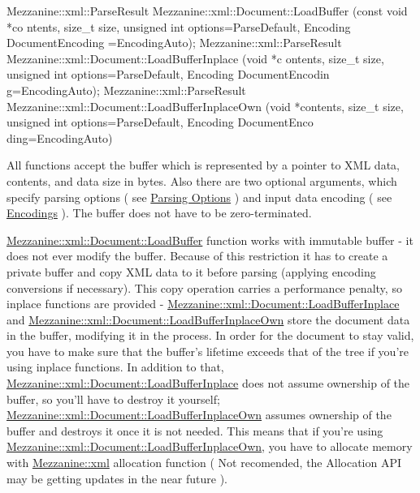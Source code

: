 \begin{DoxyCode}
 Mezzanine::xml::ParseResult Mezzanine::xml::Document::LoadBuffer (const void *co
      ntents, size_t size, unsigned int options=ParseDefault, Encoding DocumentEncoding
      =EncodingAuto);
 Mezzanine::xml::ParseResult Mezzanine::xml::Document::LoadBufferInplace (void *c
      ontents, size_t size, unsigned int options=ParseDefault, Encoding DocumentEncodin
      g=EncodingAuto);
 Mezzanine::xml::ParseResult Mezzanine::xml::Document::LoadBufferInplaceOwn (void
       *contents, size_t size, unsigned int options=ParseDefault, Encoding DocumentEnco
      ding=EncodingAuto)
\end{DoxyCode}
 All functions accept the buffer which is represented by a pointer to XML data, contents, and data size in bytes. Also there are two optional arguments, which specify parsing options ( see \hyperlink{XMLManual_XMLLoadingParsingOptions}{Parsing Options} ) and input data encoding ( see \hyperlink{XMLManual_XMLLoadingEncodings}{Encodings} ). The buffer does not have to be zero-\/terminated. \par
 \par
 \hyperlink{classMezzanine_1_1xml_1_1Document_a37117f3f1e6f5a834c638421a3d4b7ec}{Mezzanine::xml::Document::LoadBuffer} function works with immutable buffer -\/ it does not ever modify the buffer. Because of this restriction it has to create a private buffer and copy XML data to it before parsing (applying encoding conversions if necessary). This copy operation carries a performance penalty, so inplace functions are provided -\/ \hyperlink{classMezzanine_1_1xml_1_1Document_af53e73f421e6a4ad8655262c377ceb8a}{Mezzanine::xml::Document::LoadBufferInplace} and \hyperlink{classMezzanine_1_1xml_1_1Document_ae795eaf8f7985d292f81295c210dbf5d}{Mezzanine::xml::Document::LoadBufferInplaceOwn} store the document data in the buffer, modifying it in the process. In order for the document to stay valid, you have to make sure that the buffer's lifetime exceeds that of the tree if you're using inplace functions. In addition to that, \hyperlink{classMezzanine_1_1xml_1_1Document_af53e73f421e6a4ad8655262c377ceb8a}{Mezzanine::xml::Document::LoadBufferInplace} does not assume ownership of the buffer, so you'll have to destroy it yourself; \hyperlink{classMezzanine_1_1xml_1_1Document_ae795eaf8f7985d292f81295c210dbf5d}{Mezzanine::xml::Document::LoadBufferInplaceOwn} assumes ownership of the buffer and destroys it once it is not needed. This means that if you're using \hyperlink{classMezzanine_1_1xml_1_1Document_ae795eaf8f7985d292f81295c210dbf5d}{Mezzanine::xml::Document::LoadBufferInplaceOwn}, you have to allocate memory with \hyperlink{namespaceMezzanine_1_1xml}{Mezzanine::xml} allocation function ( Not recomended, the Allocation API may be getting updates in the near future ). \par
